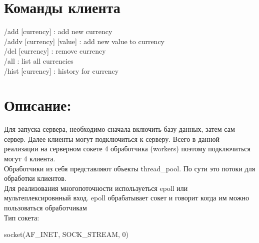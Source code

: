 \documentclass[10pt,a4paper,oneside]{article}
\begin{document}
\section{Команды клиента}
/add [currency] : add new currency\\
/addv [currency] [value] : add new value to currency\\
/del [currency] : remove currency\\
/all : list all currencies\\
/hist [currency] : history for currency\\


\section{Описание:}
Для запуска сервера, необходимо сначала включить базу данных, затем сам сервер. Далее клиенты могут подключиться к серверу. Всего в данной реализации на серверном сокете 4 обработчика (workers) поэтому подключиться могут 4 клиента.\\
Обработчики из себя представляют объекты thread\_pool. По сути это потоки для обработки клиентов.\\
Для реализования многопоточности используеться epoll или мультеплексировнный вход. epoll обрабатывает сокет и говорит когда им можно пользоваться обработчикам\\

Тип сокета:

socket(AF\_INET, SOCK\_STREAM, 0)
\end{document}
